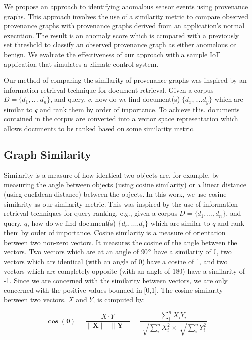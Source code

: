  \par We propose an approach to identifying anomalous sensor events using provenance graphs. This approach involves the use of a similarity metric to compare observed provenance graphs with provenance graphs derived from an application's normal execution. The result is an anomaly score which is  compared with a previously set threshold to classify an observed provenance graph as either anomalous or benign. We evaluate the effectiveness of our approach with a sample IoT application that simulates a climate control system.
 
 \par Our method of comparing the similarity of provenance graphs was inspired by an information retrieval technique for document retrieval. Given a corpus $D = \{ d_1,..., d_n\}$, and query, $q$, how do we find document(s) $\{d_x,....d_y\}$ which are similar to $q$ and rank them by order of importance. To achieve this, documents contained in the corpus are converted into a vector space representation which allows documents to be ranked based on some similarity metric.


\subsection{Graph Similarity} \label{similarity}
Similarity is a measure of how identical two objects are, for example, by measuring the angle between objects (using cosine similarity) or a linear distance (using euclidean distance) between the objects. In this work, we use cosine similarity as our similarity metric. This was inspired by the use of information retrieval techniques for query ranking. e.g., given a corpus $D = \{ d_1,..., d_n\}$, and query, $q$, how do we find document(s) $\{d_x,....d_y\}$ which are similar to $q$ and rank them by order of importance. Cosine similarity is a measure of orientation between two non-zero vectors. It measures the cosine of the angle between the vectors. Two vectors which are at an angle of 90$\degree$ have a similarity of 0, two vectors which are identical (with an angle of 0\degree) have a cosine of 1, and two vectors which are completely opposite (with an angle of 180\degree) have a similarity of -1. Since we are concerned with the similarity between vectors, we are only concerned with the positive values bounded in [0,1]. The cosine similarity between two vectors, $X$ and $Y$, is computed by:

\[\mathbf{\cos{(\theta)}} = \dfrac{X \cdot  Y}{ \lVert \mathbf{X} \rVert \cdot \lVert \mathbf{Y} \rVert} =\dfrac{\sum_{i}^n X_i Y_i }{\sqrt[]{\sum_{i}^n X_i^2} \times \sqrt[]{\sum_{i}^n Y_i^2}}  \]

